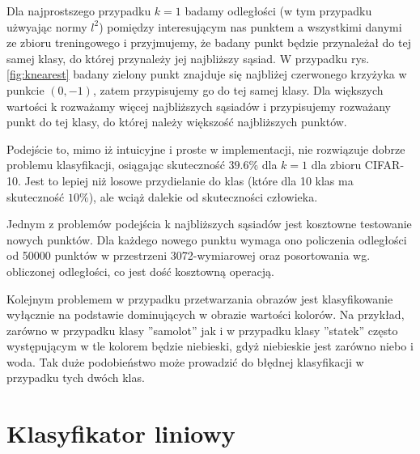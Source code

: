 Dla najprostszego przypadku $k=1$ badamy odległości (w tym przypadku użwyając normy $l^2$) pomiędzy interesującym nas punktem a wszystkimi danymi ze zbioru treningowego i przyjmujemy, że badany punkt będzie przynależał do tej samej klasy, do której przynależy jej najbliższy sąsiad.
W przypadku rys. \ref{fig:knearest} badany zielony punkt znajduje się najbliżej czerwonego krzyżyka w punkcie $(0,-1)$, zatem przypisujemy go do tej samej klasy.
Dla większych wartości k rozważamy więcej najbliższych sąsiadów i przypisujemy rozważany punkt do tej klasy, do której należy większość najbliższych punktów.

Podejście to, mimo iż intuicyjne i proste w implementacji, nie rozwiązuje dobrze problemu klasyfikacji, osiągając skuteczność $39.6\%$ dla $k = 1$ dla zbioru CIFAR-10.
Jest to lepiej niż losowe przydielanie do klas (które dla 10 klas ma skuteczność $10\%$), ale wciąż dalekie od skuteczności człowieka.

Jednym z problemów podejścia k najbliższych sąsiadów jest kosztowne testowanie nowych punktów.
Dla każdego nowego punktu wymaga ono policzenia odległości od 50000 punktów w przestrzeni 3072-wymiarowej oraz posortowania wg. obliczonej odległości, co jest dość kosztowną operacją.

Kolejnym problemem w przypadku przetwarzania obrazów jest klasyfikowanie wyłącznie na podstawie dominujących w obrazie wartości kolorów.
Na przykład, zarówno w przypadku klasy ''samolot'' jak i w przypadku klasy ''statek'' często występującym w tle kolorem będzie niebieski, gdyż niebieskie jest zarówno niebo i woda.
Tak duże podobieństwo może prowadzić do błędnej klasyfikacji w przypadku tych dwóch klas. \cite{cs231n}

\section{Klasyfikator liniowy}\label{sec:linear_classifier}

